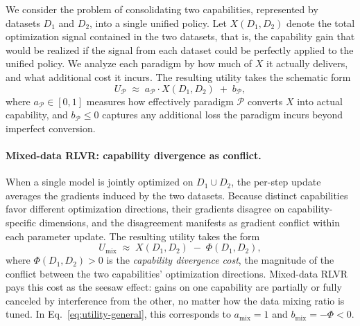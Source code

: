 \documentclass{llmxive}
\begin{document}
We consider the problem of consolidating two capabilities, represented by datasets $D_1$ and $D_2$, into a single unified policy. Let $X(D_1, D_2)$ denote the total optimization signal contained in the two datasets, that is, the capability gain that would be realized if the signal from each dataset could be perfectly applied to the unified policy. We analyze each paradigm by how much of $X$ it actually delivers, and what additional cost it incurs. The resulting utility takes the schematic form
\begin{equation}
U_{\mathcal{P}} \;\approx\; a_{\mathcal{P}} \cdot X(D_1, D_2) \;+\; b_{\mathcal{P}},
\label{eq:utility-general}
\end{equation}
where $a_{\mathcal{P}} \in [0, 1]$ measures how effectively paradigm $\mathcal{P}$ converts $X$ into actual capability, and $b_{\mathcal{P}} \le 0$ captures any additional loss the paradigm incurs beyond imperfect conversion.

\paragraph{Mixed-data RLVR: capability divergence as conflict.}
When a single model is jointly optimized on $D_1 \cup D_2$, the per-step update averages the gradients induced by the two datasets. Because distinct capabilities favor different optimization directions, their gradients disagree on capability-specific dimensions, and the disagreement manifests as gradient conflict within each parameter update. The resulting utility takes the form
\begin{equation}
U_{\text{mix}} \;\approx\; X(D_1, D_2) \;-\; \Phi(D_1, D_2),
\label{eq:utility-mix}
\end{equation}
where $\Phi(D_1, D_2) > 0$ is the \textit{capability divergence cost}, the magnitude of the conflict between the two capabilities' optimization directions. Mixed-data RLVR pays this cost as the seesaw effect: gains on one capability are partially or fully canceled by interference from the other, no matter how the data mixing ratio is tuned. In Eq.~\eqref{eq:utility-general}, this corresponds to $a_{\text{mix}} = 1$ and $b_{\text{mix}} = -\Phi < 0$.
\end{document}
